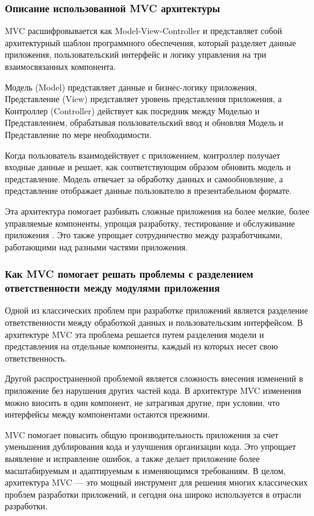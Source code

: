 \subsubsection{Описание использованной MVC архитектуры}

MVC расшифровывается как Model-View-Controller и представляет собой архитектурный шаблон программного обеспечения, который разделяет данные приложения, пользовательский интерфейс и логику управления на три взаимосвязанных компонента. 

Модель (Model) представляет данные и бизнес-логику приложения, Представление (View) представляет уровень представления приложения, а Контроллер (Controller) действует как посредник между Моделью и Представлением, обрабатывая пользовательский ввод и обновляя Модель и Представление по мере необходимости.

Когда пользователь взаимодействует с приложением, контроллер получает входные данные и решает, как соответствующим образом обновить модель и представление. Модель отвечает за обработку данных и самообновление, а представление отображает данные пользователю в презентабельном формате.

Эта архитектура помогает разбивать сложные приложения на более мелкие, более управляемые компоненты, упрощая разработку, тестирование и обслуживание приложения \cite{DesigningMVCModelforRapidWebApplicationDevelopment}. Это также упрощает сотрудничество между разработчиками, работающими над разными частями приложения.


\subsubsection{Как MVC помогает решать проблемы с разделением ответственности между модулями приложения}

Одной из классических проблем при разработке приложений является разделение ответственности между обработкой данных и пользовательским интерфейсом. В архитектуре MVC эта проблема решается путем разделения модели и представления на отдельные компоненты, каждый из которых несет свою ответственность.

Другой распространенной проблемой является сложность внесения изменений в приложение без нарушения других частей кода. В архитектуре MVC изменения можно вносить в один компонент, не затрагивая другие, при условии, что интерфейсы между компонентами остаются прежними.

MVC помогает повысить общую производительность приложения за счет уменьшения дублирования кода и улучшения организации кода. Это упрощает выявление и исправление ошибок, а также делает приложение более масштабируемым и адаптируемым к изменяющимся требованиям. В целом, архитектура MVC — это мощный инструмент для решения многих классических проблем разработки приложений, и сегодня она широко используется в отрасли разработки.


